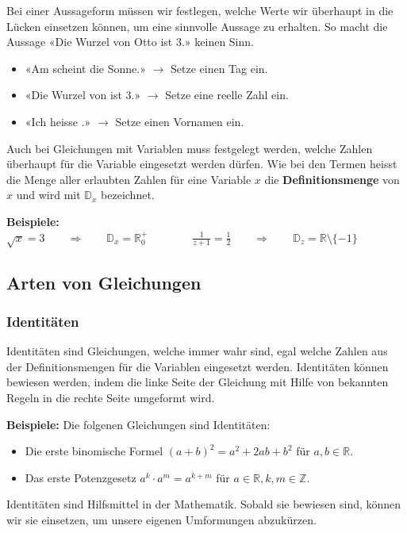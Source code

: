 Bei einer Aussageform müssen wir festlegen, welche Werte wir überhaupt in die Lücken einsetzen können, um eine sinnvolle Aussage zu erhalten. So macht die Aussage «Die Wurzel von Otto ist 3.» keinen Sinn.
\begin{example}
  \begin{itemize}[noitemsep]
    \item «Am \underline{\hspace{1cm}} scheint die Sonne.» $\rightarrow$ Setze einen Tag ein.
    \item «Die Wurzel von \underline{\hspace{1cm}} ist 3.» $\rightarrow$ Setze eine reelle Zahl ein.
    \item «Ich heisse \underline{\hspace{1cm}}.» $\rightarrow$ Setze einen Vornamen ein.
  \end{itemize}
\end{example}
Auch bei Gleichungen mit Variablen muss festgelegt werden, welche Zahlen überhaupt für die Variable eingesetzt werden dürfen. Wie bei den Termen heisst die Menge aller erlaubten Zahlen für eine Variable $x$ die \textbf{Definitionsmenge} von $x$ und wird mit $\mathbb{D}_{x}$ bezeichnet.
\begin{example}
  \textbf{Beispiele:}
  $\sqrt{x} = 3 \qquad\Rightarrow\qquad \mathbb{D}_{x} = \mathbb{R}_{0}^{+} \qquad\qquad
    \frac{1}{z+1} = \frac{1}{2} \qquad\Rightarrow\qquad \mathbb{D}_{z} = \mathbb{R}\setminus\{-1\}$
\end{example}

\subsection{Arten von Gleichungen}

\subsubsection{Identitäten}

Identitäten sind Gleichungen, welche immer wahr sind, egal welche Zahlen aus der Definitionsmengen für die Variablen eingesetzt werden. Identitäten können bewiesen werden, indem die linke Seite der Gleichung mit Hilfe von bekannten Regeln in die rechte Seite umgeformt wird.
\begin{example}
  \textbf{Beispiele:} Die folgenen Gleichungen sind Identitäten:
  \begin{itemize}
    \item Die erste binomische Formel $(a+b)^2= a^2+2ab+b^2$ für $a,b \in\mathbb{R}$.
    \item Das erste Potenzgesetz $a^k\cdot a^m = a^{k+m}$ für $a \in\mathbb{R}, k,m \in \mathbb{Z}$.
  \end{itemize}
\end{example}
Identitäten sind Hilfsmittel in der Mathematik. Sobald sie bewiesen sind, können wir sie einsetzen, um unsere eigenen Umformungen abzukürzen.

